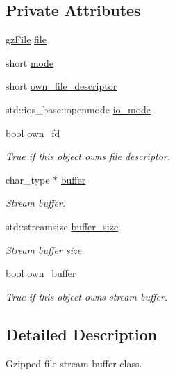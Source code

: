 \subsection*{Private Attributes}
\begin{DoxyCompactItemize}
\item 
\mbox{\hyperlink{zlib_8h_a8e80bd9e2c359bc5bdabb2e97b4e62bf}{gz\+File}} \mbox{\hyperlink{classgzfilebuf_a202fd7bb0fda1bbe05fec2397255cbe6}{file}}
\item 
short \mbox{\hyperlink{classgzfilebuf_a4b67ec1d75c34ba33b2a66639959a8b8}{mode}}
\item 
short \mbox{\hyperlink{classgzfilebuf_afc49b0c1665a94dbb51a37ce8065a268}{own\+\_\+file\+\_\+descriptor}}
\item 
std\+::ios\+\_\+base\+::openmode \mbox{\hyperlink{classgzfilebuf_a30b7bb833856a68054d8aec490a8c735}{io\+\_\+mode}}
\item 
\mbox{\hyperlink{libretro_8h_a4a26dcae73fb7e1528214a068aca317e}{bool}} \mbox{\hyperlink{classgzfilebuf_a30e53855a87d4387b0722e335e886a83}{own\+\_\+fd}}
\begin{DoxyCompactList}\small\item\em True if this object owns file descriptor. \end{DoxyCompactList}\item 
char\+\_\+type $\ast$ \mbox{\hyperlink{classgzfilebuf_a9d74c28ba4a43d0033663d53e0a3e653}{buffer}}
\begin{DoxyCompactList}\small\item\em Stream buffer. \end{DoxyCompactList}\item 
std\+::streamsize \mbox{\hyperlink{classgzfilebuf_a0b51afb243ec8460452ec3648f2796b8}{buffer\+\_\+size}}
\begin{DoxyCompactList}\small\item\em Stream buffer size. \end{DoxyCompactList}\item 
\mbox{\hyperlink{libretro_8h_a4a26dcae73fb7e1528214a068aca317e}{bool}} \mbox{\hyperlink{classgzfilebuf_ac82c6cf702b67123490f2ed51f00c971}{own\+\_\+buffer}}
\begin{DoxyCompactList}\small\item\em True if this object owns stream buffer. \end{DoxyCompactList}\end{DoxyCompactItemize}


\subsection{Detailed Description}
Gzipped file stream buffer class. 

